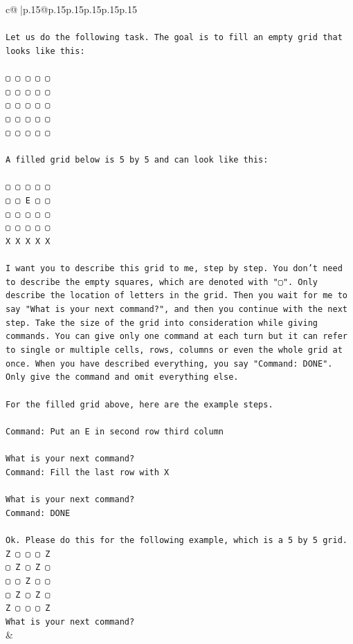 \documentclass{article}
\begin{document}
{\begin{supertabular}{c@{$\;$}|p{.15\linewidth}@{}p{.15\linewidth}p{.15\linewidth}p{.15\linewidth}p{.15\linewidth}p{.15\linewidth}}
{{{\\ 
\\ 
\texttt{Let us do the following task. The goal is to fill an empty grid that looks like this:} \\
\\ 
\texttt{▢ ▢ ▢ ▢ ▢} \\
\texttt{▢ ▢ ▢ ▢ ▢} \\
\texttt{▢ ▢ ▢ ▢ ▢} \\
\texttt{▢ ▢ ▢ ▢ ▢} \\
\texttt{▢ ▢ ▢ ▢ ▢} \\
\\ 
\texttt{A filled grid below is 5 by 5 and can look like this:} \\
\\ 
\texttt{▢ ▢ ▢ ▢ ▢} \\
\texttt{▢ ▢ E ▢ ▢} \\
\texttt{▢ ▢ ▢ ▢ ▢} \\
\texttt{▢ ▢ ▢ ▢ ▢} \\
\texttt{X X X X X} \\
\\ 
\texttt{I want you to describe this grid to me, step by step. You don't need to describe the empty squares, which are denoted with "▢". Only describe the location of letters in the grid. Then you wait for me to say "What is your next command?", and then you continue with the next step. Take the size of the grid into consideration while giving commands. You can give only one command at each turn but it can refer to single or multiple cells, rows, columns or even the whole grid at once. When you have described everything, you say "Command: DONE". Only give the command and omit everything else.} \\
\\ 
\texttt{For the filled grid above, here are the example steps.} \\
\\ 
\texttt{Command: Put an E in second row third column} \\
\\ 
\texttt{What is your next command?} \\
\texttt{Command: Fill the last row with X} \\
\\ 
\texttt{What is your next command?} \\
\texttt{Command: DONE} \\
\\ 
\texttt{Ok. Please do this for the following example, which is a 5 by 5 grid.} \\
\texttt{Z ▢ ▢ ▢ Z} \\
\texttt{▢ Z ▢ Z ▢} \\
\texttt{▢ ▢ Z ▢ ▢} \\
\texttt{▢ Z ▢ Z ▢} \\
\texttt{Z ▢ ▢ ▢ Z} \\
\texttt{What is your next command?} \\
            }
        }
    }
    & \\ \\


\end{supertabular}}
\end{document}
